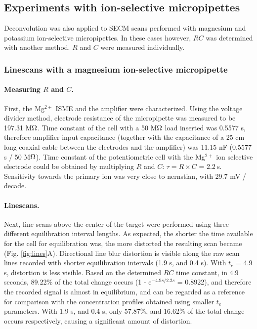 		\subsection{Experiments with ion-selective micropipettes}
Deconvolution was also applied to SECM scans performed with magnesium and potassium ion-selective micropipettes.
In these cases however, $RC$ was determined with another method.
$R$ and $C$ were measured individually.

			\subsubsection{Linescans with a magnesium ion-selective micropipette}
\label{capacitance} 
				\paragraph{Measuring $R$ and $C$.}

First, the Mg$^{2+}$ ISME and the amplifier were characterized.
Using the voltage divider method, electrode resistance of the micropipette was measured to be 197.31 M$\ohm$.
Time constant of the cell with a 50 M$\ohm$ load inserted was 0.5577 s, therefore amplifier input capacitance (together with the capacitance of a 25 cm long coaxial cable between the electrodes and the amplifier) was 11.15 nF (0.5577 s / 50 M$\ohm$).
Time constant of the potentiometric cell with the Mg$^{2+}$ ion selective electrode could be obtained by multiplying $R$ and $C$: $\tau = R\times C$ = 2.2$~$s.
Sensitivity towards the primary ion was very close to nernstian, with 29.7 mV / decade.

				\paragraph{Linescans.}
Next, line scans above the center of the target were performed using three different equilibration interval lengths.
As expected, the shorter the time available for the cell for equilibration was, the more distorted the resulting scan became (Fig. \ref{fig:lines}A).
Directional line blur distortion is visible along the raw scan lines recorded with shorter equilibration intervals (1.9 s, and 0.4 s).
With $t_e$ = 4.9 s, distortion is less visible.
Based on the determined $RC$ time constant, in 4.9 seconds, 89.22\% of the total change occurs (1 - e$^{-4.9 s / 2.2 s}$ = 0.8922), and therefore the recorded signal is almost in equilibrium, and can be regarded as a reference for comparison with the concentration profiles obtained using smaller $t_e$ parameters.
With 1.9 s, and 0.4 s, only 57.87\%, and 16.62\% of the total change occurs respectively, causing a significant amount of distortion.

